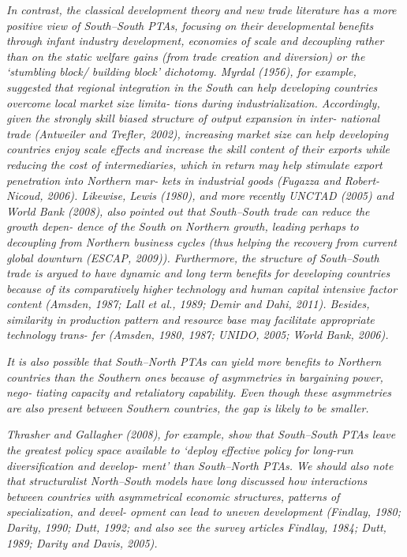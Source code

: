 \documentclass{article}%
\begin{document}
\emph{In contrast, the classical development theory and new trade
literature has a more positive view of South--South PTAs, focusing on
their developmental benefits through infant industry development,
economies of scale and decoupling rather than on the static welfare
gains (from trade creation and diversion) or the `stumbling block/
building block' dichotomy. Myrdal (1956), for example, suggested that
regional integration in the South can help developing countries overcome
local market size limita- tions during industrialization. Accordingly,
given the strongly skill biased structure of output expansion in inter-
national trade (Antweiler and Trefler, 2002), increasing market size can
help developing countries enjoy scale effects and increase the skill
content of their exports while reducing the cost of intermediaries,
which in return may help stimulate export penetration into Northern mar-
kets in industrial goods (Fugazza and Robert-Nicoud, 2006). Likewise,
Lewis (1980), and more recently UNCTAD (2005) and World Bank (2008),
also pointed out that South--South trade can reduce the growth depen-
dence of the South on Northern growth, leading perhaps to decoupling
from Northern business cycles (thus helping the recovery from current
global downturn (ESCAP, 2009)). Furthermore, the structure of
South--South trade is argued to have dynamic and long term benefits for
developing countries because of its comparatively higher technology and
human capital intensive factor content (Amsden, 1987; Lall et al., 1989;
Demir and Dahi, 2011). Besides, similarity in production pattern and
resource base may facilitate appropriate technology trans- fer (Amsden,
1980, 1987; UNIDO, 2005; World Bank, 2006).}

\emph{It is also possible that South--North PTAs can yield more benefits
to Northern countries than the Southern ones because of asymmetries in
bargaining power, nego- tiating capacity and retaliatory capability.
Even though these asymmetries are also present between Southern
countries, the gap is likely to be smaller.}

\emph{Thrasher and Gallagher (2008), for example, show that South--South
PTAs leave the greatest policy space available to `deploy effective
policy for long-run diversification and develop- ment' than South--North
PTAs. We should also note that structuralist North--South models have
long discussed how interactions between countries with asymmetrical
economic structures, patterns of specialization, and devel- opment can
lead to uneven development (Findlay, 1980; Darity, 1990; Dutt, 1992; and
also see the survey articles Findlay, 1984; Dutt, 1989; Darity and
Davis, 2005).}
\end{document}
